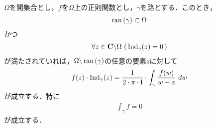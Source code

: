 	\begin{screen}
		\begin{thm}[Cauchyの積分定理]
			$\Omega$を開集合とし，$f$を$\Omega$上の正則関数とし，$\gamma$を路とする．このとき，
			\begin{align}
				\operatorname*{ran} \left(\gamma\right) \subset \Omega
			\end{align}
			かつ
			\begin{align}
				\forall z \in \mathbf{C} \backslash \Omega\, \left(\, \operatorname{Ind}_{\gamma}(z) = 0\, \right)
			\end{align}
			が満たされていれば，$\Omega \backslash \operatorname*{ran} \left(\gamma\right)$の任意の要素$z$に対して
			\begin{align}
				f(z) \cdot \operatorname{Ind}_{\gamma}(z) = \frac{1}{2\cdot\pi\cdot\mathbf{i}} \cdot \int_{\gamma} \frac{f(w)}{w - z}\ dw
			\end{align}
			が成立する．特に
			\begin{align}
				\int_\gamma f = 0
			\end{align}
			が成立する．
		\end{thm}
	\end{screen}
	
